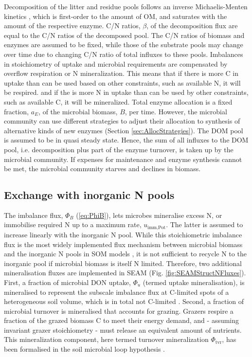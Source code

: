 Decomposition of the litter and residue pools follows an inverse
Michaelis-Menten kinetics \citep{Schimel03}, which is first-order to the amount
of OM, and saturates with the amount of the respective enzyme. C/N ratios,
$\beta$, of the decomposition flux are equal to the C/N ratios of the decomposed
pool. The C/N ratios of biomass and enzymes are assumed to be fixed, while those
of the substrate pools may change over time due to changing C/N ratio of total
influxes to these pools. Imbalances in stoichiometry of uptake and microbial
requirements are compensated by overflow respiration or N mineralization. This
means that if there is more C in uptake than can be used based on other
constraints, such as available N, it will be respired. and if the is more N in
uptake than can be used by other constraints, such as available C, it will be
mineralized.
Total enzyme allocation is a fixed fraction, $a_E$, of the microbial biomass,
$B$, per time. However, the microbial community can use different strategies to
adjust their allocation to synthesis of alternative kinds of new enzymes
(Section \ref{sec:AllocStrategies}).
The DOM pool is assumed to be in quasi steady state. Hence, the sum of all
influxes to the DOM pool, i.e. decomposition plus part of the enzyme turnover,
is taken up by the microbial community. If expenses for maintenance and enzyme
synthesis cannot be met, the microbial community starves and declines in
biomass.

\subsection{Exchange with inorganic N pools}


The imbalance flux, $\Phi_B$ (\ref{eq:PhiB}), lets microbes mineralise excess N,
or immobilise required N up to a maximum rate, $u_{\operatorname{imm,Pot}}$. The
latter is assumed to increase linearly with the inorganic N pool.
While this stoichiometric imbalance flux is the most widely implemented flux
mechanism between microbial biomass and the inorganic N pools in SOM models
\citep{Manzoni09}, it is not sufficient to recycle N to the inorganic pool if
microbial biomass is itself N limited.
Therefore, two additional mineralisation fluxes are implemented in SEAM (Fig.
\ref{fig:SEAMStructNFluxes}). First, a fraction of microbial DON uptake,
$\Phi_u$ (termed uptake mineralisation), is mineralised to represent the
subscale imbalance flux at C-limited spots of a heterogeneous soil volume, which
is in total not C-limited \citep{Manzoni08}.
Second, a fraction of microbial turnover is mineralised that accounts for
grazing. Grazers respire a fraction of the grazed biomass C to meet their energy
demand, and - assuming invariant grazer stoichiometry  - must release an
equivalent amount of nutrients.
This mineralization component, here termed turnover mineralization
$\Phi_{\operatorname{tvr}}$, has been formalised in the soil microbial loop
hypothesis \citep{Clarholm85, Raynaud06}.

